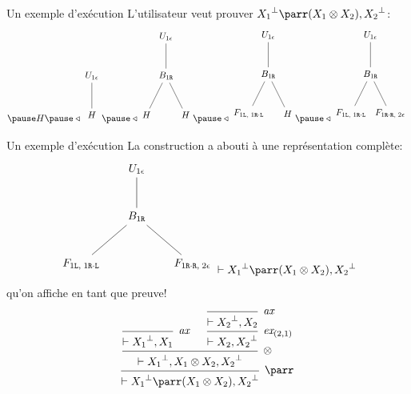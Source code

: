 \documentclass{beamer}
\newcommand*{\orth}{^\perp}
\newcommand*{\tensor}{\otimes}
\newcommand*{\axv}[1]{\infer{0}[\ensuremath{\mathit{ax}}]{\vdash #1}}
\newcommand*{\tensorv}[1]{\infer{2}[\ensuremath{\tensor}]{\vdash #1}}
\newcommand*{\parrv}[1]{\infer{1}[\ensuremath{\parr}]{\vdash #1}}
\newcommand*{\permv}[2]{\infer{1}[\ensuremath{\textit{ex}_{#1}}]{\vdash #2}}
\newcommand*{\Left}{\textnormal{\texttt{L}}}
\newcommand*{\Right}{\textnormal{\texttt{R}}}
\newcommand*{\relapprox}{\ensuremath{\triangleleft}}
\newcommand*{\unknown}{H}
\begin{document}
\begin{frame}{Un exemple d'exécution}
    L'utilisateur veut prouver ${X_1}\orth \parr (X_1 \tensor X_2), {X_2}\orth$:
        \pause \\
    \begin{equation*}
    \pause
    \unknown 
    \pause
    \relapprox
    \begin{tikzpicture}%
        [level 2/.style={sibling distance=3.5cm}]
        \node {$U_{1 \epsilon}$}
        child {node {$\unknown$}
        };
    \end{tikzpicture}
    \pause
    \relapprox
    \begin{tikzpicture}%
        [level 2/.style={sibling distance=1.5cm}]
        \node {$U_{1 \epsilon}$}
        child {node {$B_{1 \Right}$}
            child {node {$\unknown$}}
            child {node {$\unknown$}}
        };
    \end{tikzpicture}
    \pause
    \relapprox
    \begin{tikzpicture}%
        [level 2/.style={sibling distance=1.5cm}]
        \node {$U_{1 \epsilon}$}
        child {node {$B_{1 \Right}$}
            child {node {$F_{1 \Left, \; 1 \Right \cdot \Left}$}}
            child {node {$\unknown$}}
        };
    \end{tikzpicture}
    \pause
    \relapprox
    \begin{tikzpicture}%
        [level 2/.style={sibling distance=1.5cm}]
        \node {$U_{1 \epsilon}$}
        child {node {$B_{1 \Right}$}
            child {node {$F_{1 \Left, \; 1 \Right \cdot \Left}$}}
            child {node {$F_{1 \Right \cdot \Right, \; 2 \epsilon}$}}
        };
    \end{tikzpicture}
    \end{equation*}
\end{frame}

\begin{frame}{Un exemple d'exécution}
    La construction a abouti à une représentation complète:
    \begin{equation*}
        \begin{tikzpicture}%
            [level 2/.style={sibling distance=3.5cm}]
            \node {$U_{1 \epsilon}$}
            child {node {$B_{1 \Right}$}
                child {node {$F_{1 \Left, \; 1 \Right \cdot \Left}$}}
                child {node {$F_{1 \Right \cdot \Right, \; 2 \epsilon}$}}
            };
        \end{tikzpicture}
        \vdash {X_1}\orth \parr (X_1 \tensor X_2), {X_2}\orth
    \end{equation*}
    \pause qu'on affiche en tant que preuve!
    \begin{equation*}
        \begin{prooftree}
            \axv{{X_1}\orth, X_1}
            \axv{{X_2}\orth, X_2}
            \permv{(2, 1)}{X_2, {X_2}\orth}
            \tensorv{{X_1}\orth, X_1 \tensor X_2, {X_2}\orth}
            \parrv{{X_1}\orth \parr (X_1 \tensor X_2), {X_2}\orth}
        \end{prooftree}
    \end{equation*}
\end{frame}
\end{document}
